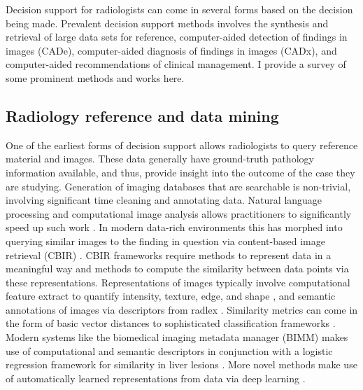 Decision support for radiologists can come in several forms based on the decision being made. Prevalent decision support methods involves the synthesis and retrieval of large data sets for reference, computer-aided detection of findings in images (CADe), computer-aided diagnosis of findings in images (CADx), and computer-aided recommendations of clinical management. I provide a survey of some prominent methods and works here.

\subsection{Radiology reference and data mining}
One of the earliest forms of decision support allows radiologists to query reference material and images. 
These data generally have ground-truth pathology information available, and thus, provide insight into the outcome of the case they are studying.
Generation of imaging databases that are searchable is non-trivial, involving significant time cleaning and annotating data.
Natural language processing and computational image analysis allows practitioners to significantly speed up such work  \cite{Depeursinge:2012ce, Bozkurt:2014jw,Nassif:2009du}.
In modern data-rich environments this has morphed into querying similar images to the finding in question via content-based image retrieval (CBIR) \cite{Akgul:2011ey}.
CBIR frameworks require methods to represent data in a meaningful way and methods to compute the similarity between data points via these representations. Representations of images typically involve computational feature extract to quantify intensity, texture, edge, and shape \cite{Strela:2002vq,Zhao:2005wb, Hong:2006ti,Manay:2006un,MRangayyan:2005td,Xu:2012bh}, and semantic annotations of images via descriptors from radlex \cite{Langlotz:2006jn}. Similarity metrics can come in the form of basic vector distances to sophisticated classification frameworks \cite{Akgul:2011ey}. Modern systems like the biomedical imaging metadata manager (BIMM) makes use of computational and semantic descriptors in conjunction with a logistic regression framework for similarity in liver lesions \cite{Korenblum:2011gx}. More novel methods make use of automatically learned representations from data via deep learning \cite{Shin:2015wl}. 

